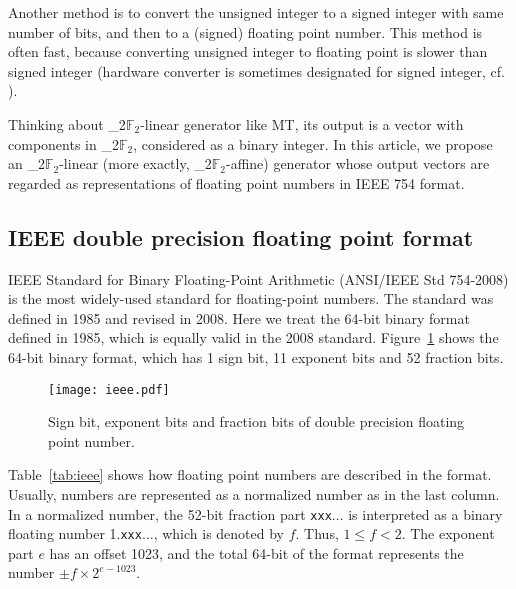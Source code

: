 \documentclass{svmult}
\def\bbf2{\ifmmode\mathbb{F}_2\else$\mathbb{F}_2$\fi}%
\begin{document}
Another method is to convert the unsigned integer to 
a signed integer with same number of bits,
and then to a (signed) floating point number.
This method is often fast, because converting unsigned
integer to floating point is slower than signed integer 
(hardware converter is sometimes designated for signed integer,
cf. \cite{doornik}). 

Thinking about \bbf2-linear generator like MT, its output is 
a vector with components in \bbf2, considered as
a binary integer. In this article, we propose an \bbf2-linear 
(more exactly, \bbf2-affine) generator whose
output vectors are regarded as representations 
of floating point numbers in IEEE 754 format. 

\subsection{IEEE double precision floating point format}
\label{sec:ieee}

IEEE Standard for Binary Floating-Point Arithmetic (ANSI/IEEE Std
754-2008)\cite{ieee754} is the most widely-used standard for
floating-point numbers. The standard was defined in 1985 and revised
in 2008. Here we treat the 64-bit binary format defined in 1985,
which is equally valid in the 2008 standard. Figure~\ref{fig:ieee}
shows the 64-bit binary format, which has 1 sign bit, 11 exponent bits
and 52 fraction bits.

\begin{figure}
  \begin{center}
    \texttt{[image: ieee.pdf]}
    \caption{Sign bit, exponent bits and fraction bits of double
      precision floating point number.}
    \label{fig:ieee}
  \end{center}
\end{figure}

Table~\ref{tab:ieee} shows how floating point numbers are described in
the format. Usually, numbers are represented as a normalized
number as in the last column. In a normalized number, 
the 52-bit fraction part \texttt{xxx}$\ldots$ is interpreted
as a binary floating number 1.\texttt{xxx}$\ldots$, which 
is denoted by $f$. Thus, $1 \le f < 2$.
The exponent part $e$ has an offset 1023, 
and the total 64-bit of the format represents the number
$\pm f \times 2^{e - 1023}$. 
\end{document}
